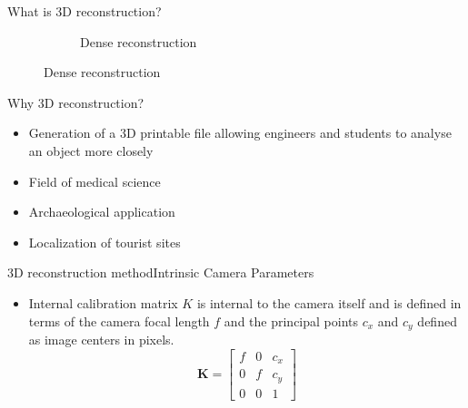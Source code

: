 \documentclass{beamer}
\begin{document}
\begin{frame}{What is 3D reconstruction?}{}
\begin{figure}[ht!]
\begin{subfigure}{.5\textwidth}
          \caption{Dense reconstruction}
          \label{fig:sub2}
      \end{subfigure}
      \label{figstart}
    \end{figure}
    \note{\textcolor{red}{Kartikeya\\}}
    \note{\textcolor{green}{Prateek\\}}
\end{frame}

\begin{frame}{Why 3D reconstruction?}{}
    \begin{itemize}
      \item Generation of a 3D printable file allowing engineers and students to analyse an object more closely
      \item Field of medical science 
      \item Archaeological application
      \item Localization of tourist sites
    \end{itemize}
    \note{\textcolor{red}{Kartikeya\\}}
    \note{\textcolor{green}{Prateek\\}}
\end{frame}



\begin{frame}{3D reconstruction method}{Intrinsic Camera Parameters}
  \begin{itemize} 
    \item Internal calibration matrix  $K$ is internal to the camera itself and is defined in terms of the  camera focal length $f$ and the principal points $c_x$ and  $c_y$ defined as image centers in pixels.
  \begin{equation}
   \mathbf{K}  = 
    \begin{bmatrix}
    f & 0 & c_x \\ 0 & f & c_y \\
    0 & 0 & 1 
    \end{bmatrix}
  \end{equation}
  \end{itemize}
  \note{\textcolor{green}{Prateek\\}}
\end{frame}
\end{document}
